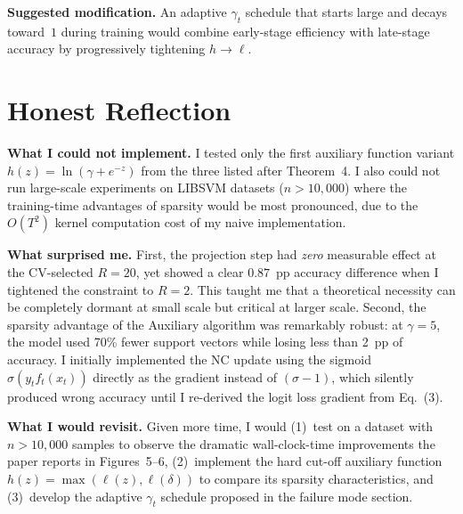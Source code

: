 \documentclass[conference,10pt]{IEEEtran}
\begin{document}
\textbf{Suggested modification.} An adaptive $\gamma_t$ schedule that starts large and decays toward~$1$ during training would combine early-stage efficiency with late-stage accuracy by progressively tightening $h \to \ell$.

\section{Honest Reflection}

\textbf{What I could not implement.}
I tested only the first auxiliary function variant $h(z) = \ln(\gamma + e^{-z})$ from the three listed after Theorem~4. I also could not run large-scale experiments on LIBSVM datasets ($n > 10{,}000$) where the training-time advantages of sparsity would be most pronounced, due to the $O(T^2)$ kernel computation cost of my naive implementation.

\textbf{What surprised me.}
First, the projection step had \emph{zero} measurable effect at the CV-selected $R{=}20$, yet showed a clear $0.87$~pp accuracy difference when I tightened the constraint to $R{=}2$. This taught me that a theoretical necessity can be completely dormant at small scale but critical at larger scale. Second, the sparsity advantage of the Auxiliary algorithm was remarkably robust: at $\gamma{=}5$, the model used 70\% fewer support vectors while losing less than 2~pp of accuracy. I initially implemented the NC update using the sigmoid $\sigma(y_t f_t(x_t))$ directly as the gradient instead of $(\sigma - 1)$, which silently produced wrong accuracy until I re-derived the logit loss gradient from Eq.~(3).

\textbf{What I would revisit.}
Given more time, I would (1)~test on a dataset with $n > 10{,}000$ samples to observe the dramatic wall-clock-time improvements the paper reports in Figures~5--6, (2)~implement the hard cut-off auxiliary function $h(z) = \max(\ell(z), \ell(\delta))$ to compare its sparsity characteristics, and (3)~develop the adaptive $\gamma_t$ schedule proposed in the failure mode section.
\end{document}
